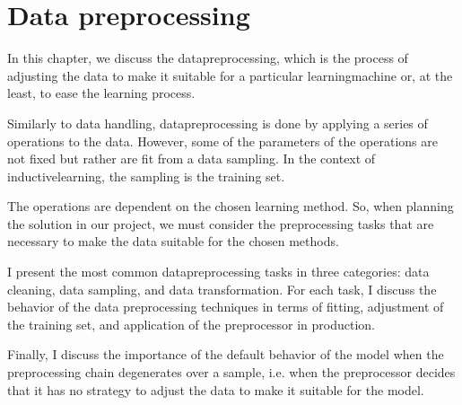 \chapter{Data preprocessing}
\label{chap:preprocess}
\glsresetall


In this chapter, we discuss the \gls{datapreprocessing}, which is the process of adjusting the
data to make it suitable for a particular \gls{learningmachine} or, at the least, to ease the
learning process.

Similarly to data handling, \gls{datapreprocessing} is done by applying a series of operations
to the data.  However, some of the parameters of the operations are not fixed but rather
are fit from a data sampling.  In the context of \gls{inductivelearning}, the sampling is the
training set.

The operations are dependent on the chosen learning method.  So, when planning the
solution in our project, we must consider the preprocessing tasks that are necessary to
make the data suitable for the chosen methods.

I present the most common \gls{datapreprocessing} tasks in three categories: data cleaning,
data sampling, and data transformation.  For each task, I discuss the behavior of the data
preprocessing techniques in terms of fitting, adjustment of the training set, and
application of the \gls{preprocessor} in production.

Finally, I discuss the importance of the default behavior of the model when the
preprocessing chain degenerates over a sample, i.e. when the \gls{preprocessor} decides that it
has no strategy to adjust the data to make it suitable for the model.

